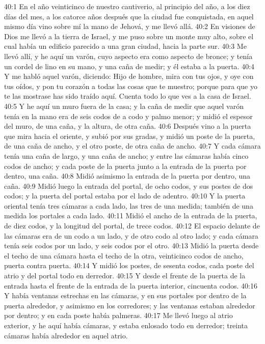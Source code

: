40:1 En el año veinticinco de nuestro cautiverio, al principio del año, a los diez días del mes, a los catorce años después que la ciudad fue conquistada, en aquel mismo día vino sobre mí la mano de Jehová, y me llevó allá.   
40:2 En visiones de Dios me llevó a la tierra de Israel, y me puso sobre un monte muy alto, sobre el cual había un edificio parecido a una gran ciudad, hacia la parte sur. 
40:3 Me llevó allí, y he aquí un varón, cuyo aspecto era como aspecto de bronce; y tenía un cordel de lino en su mano, y una caña de medir; y él estaba a la puerta.   
40:4 Y me habló aquel varón, diciendo: Hijo de hombre, mira con tus ojos, y oye con tus oídos, y pon tu corazón a todas las cosas que te muestro; porque para que yo te las mostrase has sido traído aquí. Cuenta todo lo que ves a la casa de Israel.   
40:5 Y he aquí un muro fuera de la casa; y la caña de medir que aquel varón tenía en la mano era de seis codos   de a codo y palmo menor; y midió el espesor del muro, de una caña, y la altura, de otra caña.   
40:6 Después vino a la puerta que mira hacia el oriente, y subió por sus gradas, y midió un poste de la puerta, de una caña de ancho, y el otro poste, de otra caña de ancho.   
40:7 Y cada cámara tenía una caña   de largo, y una caña de ancho; y entre las cámaras había cinco codos de ancho; y cada poste de la puerta junto a la entrada de la puerta por dentro, una caña.   
40:8 Midió asimismo la entrada de la puerta por dentro, una caña. 
40:9 Midió luego la entrada del portal, de ocho codos, y sus postes de dos codos; y la puerta del portal estaba por el lado de adentro.   
40:10 Y la puerta oriental tenía tres cámaras a cada lado, las tres de una medida; también de una medida los portales a cada lado.   
40:11 Midió el ancho de la entrada de la puerta, de diez codos, y la longitud del portal, de trece codos.   
40:12 El espacio delante de las cámaras era de un codo   a un lado, y de otro codo al otro lado; y cada cámara tenía seis codos por un lado, y seis codos por el otro.   
40:13 Midió la puerta desde el techo de una cámara hasta el techo de la otra, veinticinco codos   de ancho, puerta contra puerta.   
40:14 Y midió los postes, de sesenta codos, cada poste del atrio y del portal todo en derredor.   
40:15 Y desde el frente de la puerta de la entrada hasta el frente de la entrada de la puerta interior, cincuenta codos. 
40:16 Y había ventanas estrechas en las cámaras, y en sus portales por dentro de la puerta alrededor, y asimismo en los corredores; y las ventanas estaban alrededor por dentro; y en cada poste había palmeras.   
40:17 Me llevó luego al atrio exterior, y he aquí había cámaras, y estaba enlosado todo en derredor; treinta cámaras había alrededor en aquel atrio.   
